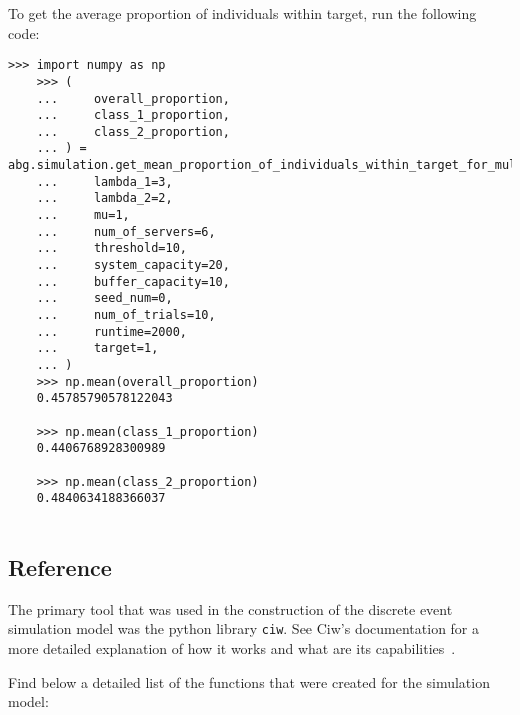 To get the average proportion of individuals within target, run the following
code:

\begin{lstlisting}[style=pystyle]
    >>> import numpy as np
    >>> (
    ...     overall_proportion,
    ...     class_1_proportion,
    ...     class_2_proportion,
    ... ) = abg.simulation.get_mean_proportion_of_individuals_within_target_for_multiple_runs(    
    ...     lambda_1=3,
    ...     lambda_2=2,
    ...     mu=1,
    ...     num_of_servers=6,
    ...     threshold=10,
    ...     system_capacity=20,
    ...     buffer_capacity=10,
    ...     seed_num=0,
    ...     num_of_trials=10,
    ...     runtime=2000,
    ...     target=1,
    ... )
    >>> np.mean(overall_proportion)
    0.45785790578122043

    >>> np.mean(class_1_proportion)
    0.4406768928300989

    >>> np.mean(class_2_proportion)
    0.4840634188366037
    
\end{lstlisting}

\subsection{Reference}
The primary tool that was used in the construction of the discrete event 
simulation model was the python library \texttt{ciw}.
See Ciw's documentation for a more detailed explanation of how it works and 
what are its capabilities~\cite{ciwpython}.

Find below a detailed list of the functions that were created for the simulation
model:

